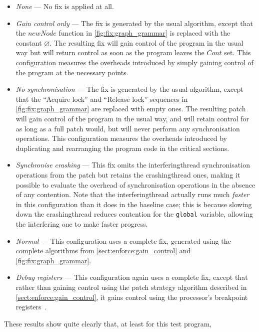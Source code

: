\begin{itemize}
\item \textit{None} --- No fix is applied at all.
\item \textit{Gain control only} --- The fix is generated by the usual
  algorithm, except that the $\mathit{newNode}$ function in
  \autoref{fig:fix:graph_grammar} is replaced with the constant
  $\varnothing$.  The resulting fix will gain control of the program
  in the usual way but will return control as soon as the program
  leaves the $\mathit{Cont}$ set.  This configuration measures the
  overheads introduced by simply gaining control of the program at the
  necessary points.
\item \textit{No synchronisation} --- The fix is generated by the
  usual algorithm, except that the ``Acquire lock'' and ``Release
  lock'' sequences in \autoref{fig:fix:graph_grammar} are replaced
  with empty ones.  The resulting patch will gain control of the
  program in the usual way, and will retain control for as long as a
  full patch would, but will never perform any synchronisation
  operations.  This configuration measures the overheads introduced by
  duplicating and rearranging the program code in the critical
  sections.
\item \textit{Synchronise crashing} --- This fix omits the
  \gls{interferingthread} synchronisation operations from the patch
  but retains the \gls{crashingthread} ones, making it possible to
  evaluate the overhead of synchronisation operations in the absence
  of any contention.  Note that the \gls{interferingthread} actually
  runs much \emph{faster} in this configuration than it does in the
  baseline case; this is because slowing down the \gls{crashingthread}
  reduces contention for the \texttt{global} variable, allowing the
  interfering one to make faster progress.
\item \textit{Normal} --- This configuration uses a complete fix,
  generated using the complete algorithms from
  \autoref{sect:enforce:gain_control} and
  \autoref{fig:fix:graph_grammar}.
\item \textit{Debug registers} --- This configuration again uses a
  complete fix, except that rather than gaining control using the
  patch strategy algorithm described in
  \autoref{sect:enforce:gain_control}, it gains control using the
  processor's breakpoint registers~\cite[Chapter 16.2: Debug
    Registers]{Intel2009}.
\end{itemize}
These results show quite clearly that, at least for this test program,

